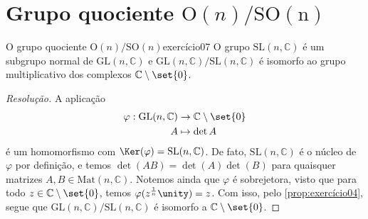 \section[Grupo quociente O(n)/SO(n)]{Grupo quociente \(\mathrm{O}(n)/\mathrm{SO(n)}\)}
\begin{proposition}{O grupo quociente \(\mathrm{O}(n)/\mathrm{SO}(n)\)}{exercício07}
    O grupo \(\mathrm{SL}(n,\mathbb{C})\) é um subgrupo normal de \(\mathrm{GL}(n,\mathbb{C})\) e \(\mathrm{GL}(n,\mathbb{C})/\mathrm{SL}(n,\mathbb{C})\) é isomorfo ao grupo multiplicativo dos complexos \(\mathbb{C}\setminus\set{0}\).
\end{proposition}
\begin{proof}[Resolução]
    A aplicação
    \begin{align*}
        \varphi : \mathrm{GL}(n, \mathbb{C}) &\to \mathbb{C}\setminus\set{0}\\
                                           A &\mapsto \det{A}
    \end{align*}
    é um homomorfismo com \(\Ker(\varphi) = \mathrm{SL}(n,\mathbb{C})\). De fato, \(\mathrm{SL}(n,\mathbb{C})\) é o núcleo de \(\varphi\) por definição, e temos \(\det(AB)=\det(A)\det(B)\) para quaisquer matrizes \(A,B \in \mathrm{Mat}(n,\mathbb{C})\). Notemos ainda que \(\varphi\) é sobrejetora, visto que para todo \(z \in \mathbb{C}\setminus\set{0}\), temos \(\varphi(z^{\frac1n} \unity) = z\). Com isso, pelo \cref{prop:exercício04}, segue que \(\mathrm{GL}(n,\mathbb{C})/\mathrm{SL}(n,\mathbb{C})\) é isomorfo a \(\mathbb{C}\setminus \set{0}\).
\end{proof}
